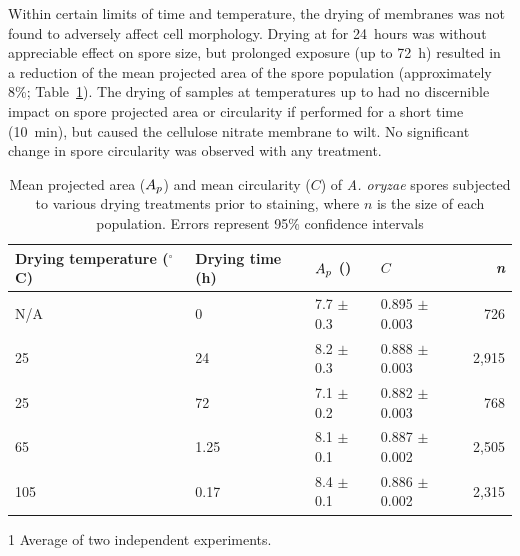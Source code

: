 Within certain limits of time and temperature, the drying of membranes was not found to adversely affect cell morphology. Drying at  for 24~hours was without appreciable effect on spore size, but prolonged exposure (up to 72~h) resulted in a reduction of the mean projected area of the spore population (approximately 8\%; Table~\ref{tab:SporeDry}). The drying of samples at temperatures up to  had no discernible impact on spore projected area or circularity if performed for a short time (10~min), but caused the cellulose nitrate membrane to wilt. No significant change in spore circularity was observed with any treatment. 

\begin{table}[tb]
	\centering
	\footnotesize
		\begin{threeparttable}
			\caption{Mean projected area ($A_p$) and mean circularity ($C$) of \emph{A. oryzae} spores subjected to various drying treatments prior to staining, where $n$ is the size of each population. Errors represent 95\% confidence intervals}
			\label{tab:SporeDry}
			\centering
				\begin{tabularx}{(\textwidth - 1cm)}{l X X X r}
					\toprule
					Drying temperature ($^\circ$C) & Drying time (h) & $A_p$ (\omics) & $C$ & \emph{n} \\ \midrule
					N/A & 0 & 7.7 $\pm$ 0.3 & 0.895 $\pm$ 0.003 & 726\\
					25\tnote{1} & 24 & 8.2 $\pm$ 0.3 & 0.888 $\pm$ 0.003 & 2,915\\
					25 & 72 & 7.1 $\pm$ 0.2 & 0.882 $\pm$ 0.003 & 768\\
					65 & 1.25 & 8.1 $\pm$ 0.1 & 0.887 $\pm$ 0.002 & 2,505\\
					105 & 0.17 & 8.4 $\pm$ 0.1 & 0.886 $\pm$ 0.002 & 2,315\\
					\bottomrule
				\end{tabularx}
			\begin{tablenotes}
				\item [1] Average of two independent experiments.
			\end{tablenotes}
		\end{threeparttable}
\end{table}

